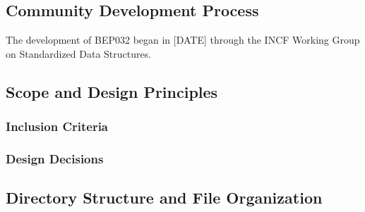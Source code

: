 \documentclass[fleqn,10pt]{wlscirep}
\begin{document}




\subsection*{Community Development Process}

The development of BEP032 began in [DATE] through the INCF Working Group on Standardized Data Structures.

\subsection*{Scope and Design Principles}

\subsubsection*{Inclusion Criteria}

\subsubsection*{Design Decisions}


\subsection*{Directory Structure and File Organization}
\end{document}
